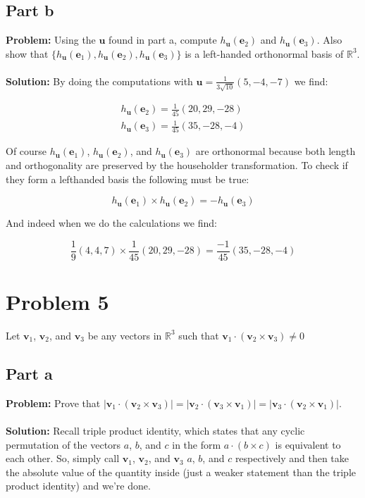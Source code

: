 \documentclass{article}
\begin{document}
\subsection{Part b}
\textbf{Problem:} Using the $\mathbf u$ found in part a, compute $h_\mathbf u(\mathbf e_2)$ and $h_\mathbf u(\mathbf e_3)$. Also show that $\{h_\mathbf u(\mathbf e_1),h_\mathbf u(\mathbf e_2),h_\mathbf u(\mathbf e_3)\}$ is a left-handed orthonormal basis of $\mathbb R^3$.
\\\\
\textbf{Solution:} By doing the computations with $\mathbf u=\frac{1}{3\sqrt{10}}(5,-4,-7)$ we find:

\begin{gather*}
  h_\mathbf u(\mathbf e_2)=\frac{1}{45}(20,29,-28)\\
  h_\mathbf u(\mathbf e_3)=\frac{1}{45}(35,-28,-4)
\end{gather*}

Of course $h_\mathbf u(\mathbf e_1)$, $h_\mathbf u(\mathbf e_2)$, and $h_\mathbf u(\mathbf e_3)$ are orthonormal because both length and orthogonality are preserved by the householder transformation. To check if they form a lefthanded basis the following must be true:

$$h_\mathbf u(\mathbf e_1)\times h_\mathbf u(\mathbf e_2)=-h_\mathbf u(\mathbf e_3)$$

And indeed when we do the calculations we find:

$$\frac{1}{9}(4,4,7)\times\frac{1}{45}(20,29,-28)=\frac{-1}{45}(35,-28,-4)$$

\section{Problem 5}
Let $\mathbf v_1$, $\mathbf v_2$, and $\mathbf v_3$ be any vectors in $\mathbb R^3$ such that $\mathbf v_1\cdot(\mathbf v_2\times\mathbf v_3)\not=0$

\subsection{Part a}
\textbf{Problem:} Prove that $|\mathbf v_1\cdot(\mathbf v_2\times\mathbf v_3)|=|\mathbf v_2\cdot(\mathbf v_3\times\mathbf v_1)|=|\mathbf v_3\cdot(\mathbf v_2\times\mathbf v_1)|$.
\\\\
\textbf{Solution:} Recall triple product identity, which states that any cyclic permutation of the vectors $a$, $b$, and $c$ in the form $a\cdot(b\times c)$ is equivalent to each other. So, simply call $\mathbf v_1$, $\mathbf v_2$, and $\mathbf v_3$ $a$, $b$, and $c$ respectively and then take the absolute value of the quantity inside (just a weaker statement than the triple product identity) and we're done.
\end{document}
